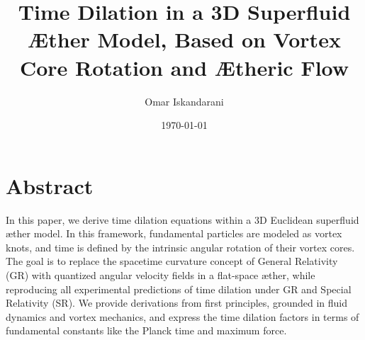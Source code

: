 \documentclass[12pt]{article}
\author{Omar Iskandarani}
\title{Time Dilation in a 3D Superfluid Æther Model, Based on Vortex Core Rotation and Ætheric Flow}
\date{\today}
\affiliation{Independent Researcher, Groningen, The Netherlands}
\begin{document}
\maketitle

\section*{Abstract}
In this paper, we derive time dilation equations within a 3D Euclidean superfluid æther model. In this framework, fundamental particles are modeled as vortex knots, and time is defined by the intrinsic angular rotation of their vortex cores. The goal is to replace the spacetime curvature concept of General Relativity (GR) with quantized angular velocity fields in a flat-space æther, while reproducing all experimental predictions of time dilation under GR and Special Relativity (SR). We provide derivations from first principles, grounded in fluid dynamics and vortex mechanics, and express the time dilation factors in terms of fundamental constants like the Planck time and maximum force.











\end{document}
